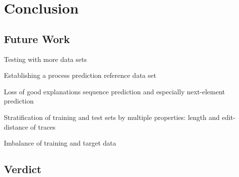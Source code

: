 \chapter{Conclusion} \label{chap:conclusion}

\section{Future Work} \label{sec:conclusion:future-work}
Testing with more data sets

Establishing a process prediction reference data set

Loss of good explanations sequence prediction and especially next-element prediction

Stratification of training and test sets by multiple properties: length and edit-distance of traces

Imbalance of training and target data

\section{Verdict} \label{sec:conclusion:verdict}
